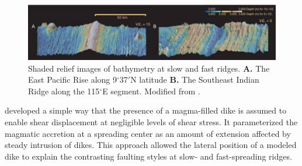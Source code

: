 \documentclass[letterpaper,12pt,notitle]{memphisthesis}                     %
\begin{document}
\begin{figure}[!htb]
	\centering
	\includegraphics[width=0.99\linewidth]{./figs/bathy_buck.png}
	\caption{Shaded relief images of bathymetry at slow and fast ridges. \textbf{A.} The East Pacific Rise along 9$^\circ$37$'$N latitude \textbf{B.} The Southeast Indian Ridge along the 115$^\circ$E segment. Modified from \citet{Buck2005}.}
	\label{fig:ridgebathymetry}
\end{figure}

\citet{Buck1998} developed a simple way %
that the presence of a magma-filled dike is assumed to enable shear displacement at negligible levels of shear stress. It parameterized the magmatic accretion at a spreading center as an amount of extension affected by steady intrusion of dikes. This approach allowed the lateral position of a modeled dike to explain the contrasting faulting styles at slow- and fast-spreading ridges.
\end{document}
